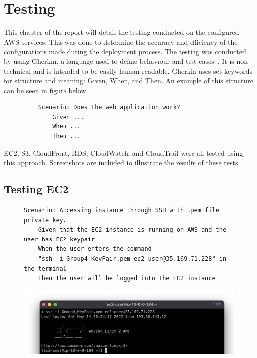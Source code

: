 \chapter{Testing}\label{ch:testing}
This chapter of the report will detail the testing conducted on the configured AWS services.
This was done to determine the accuracy and efficiency of the configurations made during the deployment process.
The testing was conducted by using Gherkin, a language used to define behaviour and test
cases~\parencite{dos2018automated}.
It is non-technical and is intended to be easily human-readable.
Gherkin uses set keywords for structure and meaning: Given, When, and Then.
An example of this structure can be seen in figure below.

\begin{figure}[!htbp]
    \centering
    \begin{verbatim}
    Scenario: Does the web application work?
        Given ...
        When ...
        Then ...
    \end{verbatim}
    \label{fig:gherkin}
\end{figure}

EC2, S3, CloudFront, RDS, CloudWatch, and CloudTrail were all tested using this approach.
Screenshots are included to illustrate the results of these tests.

\section{Testing EC2}\label{sec:testing-ec2}
\begin{figure}[!htbp]
    \centering
    \begin{verbatim}
Scenario: Accessing instance through SSH with .pem file private key.
    Given that the EC2 instance is running on AWS and the user has EC2 keypair
    When the user enters the command
    "ssh -i Group4_KeyPair.pem ec2-user@35.169.71.228" in the terminal
    Then the user will be logged into the EC2 instance
    \end{verbatim}
    \label{fig:accessing-instance-ec2}
\end{figure}

\begin{figure}[!htbp]
    \centering
    \includegraphics[width=\textwidth]{resources/ec2/ec2-logged-in}
    \label{fig:ec2-test-logged-in}
\end{figure}

